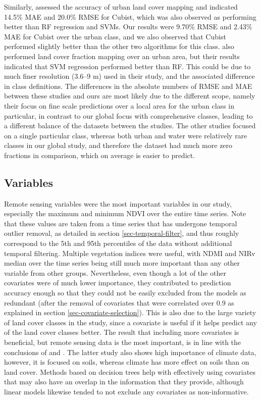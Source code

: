 \documentclass[review,authoryear,3p]{elsarticle}
\begin{document}
Similarly, \citet{walton2008subpixelrf} assessed the accuracy of urban land cover mapping and indicated 14.5\% \gls{MAE} and 20.0\% \gls{RMSE} for Cubist, which was also observed as performing better than \gls{RF} regression and \glspl{SVM}.
Our results were 9.70\% \gls{RMSE} and 2.43\% \gls{MAE} for Cubist over the urban class, and we also observed that Cubist performed slightly better than the other two algorithms for this class.
\citet{okujeni_comparison_2014} also performed land cover fraction mapping over an urban area, but their results indicated that \gls{SVM} regression performed better than \gls{RF}.
This could be due to much finer resolution (3.6–9 m) used in their study, and the associated difference in class definitions.
The differences in the absolute numbers of \gls{RMSE} and \gls{MAE} between these studies and ours are most likely due to the different scope, namely their focus on fine scale predictions over a local area for the urban class in particular, in contrast to our global focus with comprehensive classes, leading to a different balance of the datasets between the studies.
The other studies focused on a single particular class, whereas both urban and water were relatively rare classes in our global study, and therefore the dataset had much more zero fractions in comparison, which on average is easier to predict.

\subsection{Variables}

Remote sensing variables were the most important variables in our study, especially the maximum and minimum \gls{NDVI} over the entire time series.
Note that these values are taken from a time series that has undergone temporal outlier removal, as detailed in section \ref{sec-temporal-filter}, and thus roughly correspond to the 5th and 95th percentiles of the data without additional temporal filtering.
Multiple vegetation indices were useful, with \gls{NDMI} and \gls{NIRv} median over the time series being still much more important than any other variable from other groups.
Nevertheless, even though a lot of the other covariates were of much lower importance, they  contributed to prediction accuracy enough so that they could not be easily excluded from the models as redundant (after the removal of covariates that were correlated over 0.9 as explained in section \ref{sec-covariate-selection}).
This is also due to the large variety of land cover classes in the study, since a covariate is useful if it helps predict any of the land cover classes better.
The result that including more covariates is beneficial, but remote sensing data is the most important, is in line with the conclusions of \citet{li_monitoring_2018} and \citet{hengl_soilgrids250m_2017}.
The latter study also shows high importance of climate data, however, it is focused on soils, whereas climate has more effect on soils than on land cover.
Methods based on decision trees help with effectively using covariates that may also have an overlap in the information that they provide, although linear models likewise tended to not exclude any covariates as non-informative.
\end{document}

